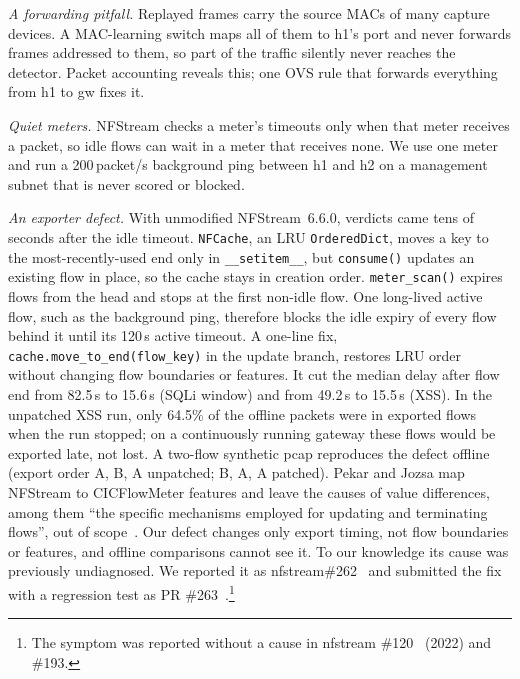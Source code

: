 \emph{A forwarding pitfall.} Replayed frames carry the source MACs of many capture devices. A MAC-learning switch maps all of them to h1's port and never forwards frames addressed to them, so part of the traffic silently never reaches the detector. Packet accounting reveals this; one OVS rule that forwards everything from h1 to gw fixes it.

\emph{Quiet meters.} NFStream checks a meter's timeouts only when that meter receives a packet, so idle flows can wait in a meter that receives none. We use one meter and run a 200\,packet/s background ping between h1 and h2 on a management subnet that is never scored or blocked.

\emph{An exporter defect.} With unmodified NFStream~6.6.0, verdicts came tens of seconds after the idle timeout. \texttt{NFCache}, an LRU \texttt{OrderedDict}, moves a key to the most-recently-used end only in \texttt{\_\_setitem\_\_}, but \texttt{consume()} updates an existing flow in place, so the cache stays in creation order. \texttt{meter\_scan()} expires flows from the head and stops at the first non-idle flow. One long-lived active flow, such as the background ping, therefore blocks the idle expiry of every flow behind it until its 120\,s active timeout. A one-line fix, \texttt{cache.move\_to\_end(flow\_key)} in the update branch, restores LRU order without changing flow boundaries or features. It cut the median delay after flow end from 82.5\,s to 15.6\,s (SQLi window) and from 49.2\,s to 15.5\,s (XSS). In the unpatched XSS run, only 64.5\% of the offline packets were in exported flows when the run stopped; on a continuously running gateway these flows would be exported late, not lost. A two-flow synthetic pcap reproduces the defect offline (export order A, B, A unpatched; B, A, A patched). Pekar and Jozsa map NFStream to CICFlowMeter features and leave the causes of value differences, among them ``the specific mechanisms employed for updating and terminating flows'', out of scope~\cite{pekar2024integrity}. Our defect changes only export timing, not flow boundaries or features, and offline comparisons cannot see it. To our knowledge its cause was previously undiagnosed. We reported it as nfstream\#262~\cite{nfstream262} and submitted the fix with a regression test as PR \#263~\cite{nfstream263}.\footnote{The symptom was reported without a cause in nfstream \#120~\cite{nfstream120} (2022) and \#193.}
